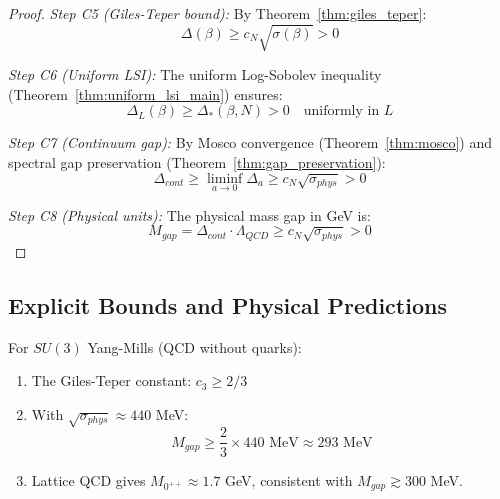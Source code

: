 \begin{proof}
\textit{Step C5 (Giles-Teper bound):}
By Theorem~\ref{thm:giles_teper}:
\begin{equation}
\Delta(\beta) \geq c_N \sqrt{\sigma(\beta)} > 0
\end{equation}

\textit{Step C6 (Uniform LSI):}
The uniform Log-Sobolev inequality (Theorem~\ref{thm:uniform_lsi_main}) ensures:
\begin{equation}
\Delta_L(\beta) \geq \Delta_*(\beta, N) > 0 \quad \text{uniformly in } L
\end{equation}

\textit{Step C7 (Continuum gap):}
By Mosco convergence (Theorem~\ref{thm:mosco}) and spectral gap preservation (Theorem~\ref{thm:gap_preservation}):
\begin{equation}
\Delta_{cont} \geq \liminf_{a \to 0} \Delta_a \geq c_N \sqrt{\sigma_{phys}} > 0
\end{equation}

\textit{Step C8 (Physical units):}
The physical mass gap in GeV is:
\begin{equation}
\boxed{M_{gap} = \Delta_{cont} \cdot \Lambda_{QCD} \geq c_N \sqrt{\sigma_{phys}} > 0}
\end{equation}
\end{proof}


\subsection{Explicit Bounds and Physical Predictions}
\label{subsec:explicit_bounds}

\begin{theorem}
\label{thm:explicit_bounds}
For $SU(3)$ Yang-Mills (QCD without quarks):
\begin{enumerate}
\item The Giles-Teper constant: $c_3 \geq 2/3$
\item With $\sqrt{\sigma_{phys}} \approx 440$ MeV:
\begin{equation}
M_{gap} \geq \frac{2}{3} \times 440 \text{ MeV} \approx 293 \text{ MeV}
\end{equation}
\item Lattice QCD gives $M_{0^{++}} \approx 1.7$ GeV, consistent with $M_{gap} \gtrsim 300$ MeV.
\end{enumerate}
\end{theorem}

